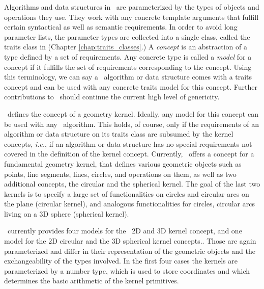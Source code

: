 Algorithms and data structures in \cgal\ are parameterized by the 
types of objects and operations they use. They work with any concrete 
template arguments that fulfill certain syntactical as well as semantic
requirements. In order to avoid long parameter lists,
the parameter types are collected into a single class, called the
traits class in \cgal{}
(Chapter \ref{chap:traits_classes}.)
A {\em concept} is an abstraction of a type 
defined by a set of requirements.
Any concrete type is called a {\em model} for a 
concept if it fulfills
the set of requirements corresponding to the concept. Using this terminology,
we can say a \cgal\ algorithm or data structure comes with a traits 
concept and can be used with any concrete traits model for this concept.
Further contributions to \cgal\ should continue the current high
level of genericity. 

\cgal\ defines the concept of a geometry kernel.%
Ideally, any
model for this concept can be used with any \cgal\ algorithm. This holds, 
of course, only if the requirements of an algorithm or data structure on its
traits class are subsumed by the kernel concepts, {\em i.e.}, if an
algorithm or data structure has no special requirements 
not covered in the definition of the kernel concept. Currently, \cgal\
offers a concept for a fundamental geometry kernel, that defines
various geometric objects such as points, line segments, lines,
circles, and operations on them, as well as two additional concepts,
the circular and the spherical kernel. The goal of the last two
kernels is to specify a large set of functionalities on circles and
circular arcs on the plane (circular kernel), and analogous
functionalities for circles, circular arcs living on a 3D sphere
(spherical kernel).

\cgal\ currently provides four models for the \cgal\ 2D and 3D kernel
concept, and one model for the 2D circular and the 3D spherical kernel
concepts.. Those are again parameterized and differ in their 
representation of the geometric objects and the exchangeability of
the types involved. 
In the first four cases the kernels are parameterized by a number type, which
is used to store coordinates and which determines the basic arithmetic
of the kernel primitives.

